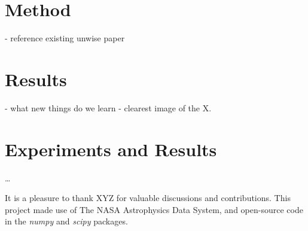 \documentclass[12pt, preprint]{aastex}
\newcommand{\project}[1]{\textsl{#1}}
\begin{document}
\section{Method}
- reference existing unwise paper 

\section{Results}  
- what new things do we learn 
- clearest image of the X. 

\section{Experiments and Results}

\ldots 

\acknowledgments
It is a pleasure to thank
XYZ
for valuable discussions and contributions.
This project made use of
  The NASA Astrophysics Data System,
  and open-source code in the \project{numpy} and \project{scipy} packages.
\end{document}
